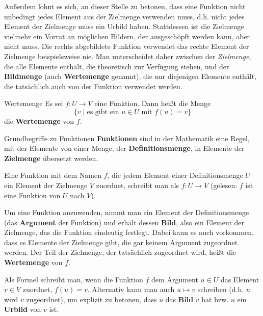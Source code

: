 \documentclass[../../main.tex]{subfiles}
\begin{document}
Außerdem lohnt es sich, an dieser Stelle zu betonen, dass eine Funktion nicht unbedingt jedes Element aus der Zielmenge verwenden muss, d.h. nicht jedes Element der Zielmenge muss ein Urbild haben. Stattdessen ist die Zielmenge vielmehr ein Vorrat an möglichen Bildern, der ausgeschöpft werden kann, aber nicht muss. Die rechts abgebildete Funktion verwendet das rechte Element der Zielmenge beispielsweise nie. Man unterscheidet daher zwischen der \emph{Zielmenge}, die alle Elemente enthält, die theoretisch zur Verfügung stehen, und der \textbf{Bildmenge} (auch \textbf{Wertemenge} genannt), die nur diejenigen Elemente enthält, die tatsächlich auch von der Funktion verwendet werden.

\begin{definition}{Wertemenge}
    Es sei $f\colon U\rightarrow V$ eine Funktion. Dann heißt die Menge
    \[\{v\mid \text{es~gibt~ein~}u\in U\text{~mit~}f(u)=v\}\]
    die \textbf{Wertemenge} von $f$.
\end{definition}

\begin{nutshell}{Grundbegriffe zu Funktionen}
    \parpic[r]{
    }
    \textbf{Funktionen} sind in der Mathematik eine Regel, mit der Elemente von einer Menge, der \textbf{Definitionsmenge}, in Elemente der \textbf{Zielmenge} übersetzt werden.
    
    Eine Funktion mit dem Namen $f$, die jedem Element einer Definitionsmenge $U$ ein Element der Zielmenge $V$ zuordnet, schreibt man als $f\colon U\rightarrow V$ (gelesen: $f$ ist eine Funktion von $U$ nach $V$).
    
    Um eine Funktion anzuwenden, nimmt man ein Element der Definitionsmenge (das \textbf{Argument} der Funktion) und erhält dessen \textbf{Bild}, also ein Element der Zielmenge, das die Funktion eindeutig festlegt. Dabei kann es auch vorkommen, dass es Elemente der Zielmenge gibt, die gar keinem Argument zugeordnet werden. Der Teil der Zielmenge, der tatsächlich zugeordnet wird, heißt die \textbf{Wertemenge} von $f$.
    
    Als Formel schreibt man, wenn die Funktion $f$ dem Argument $u\in U$ das Element $v\in V$ zuordnet, $f(u)=v$. Alternativ kann man auch $u\mapsto v$ schreiben (d.h. $u$ wird $v$ zugeordnet), um explizit zu betonen, dass $u$ das \textbf{Bild} $v$ hat bzw. $u$ ein \textbf{Urbild} von $v$ ist.
\end{nutshell}
\end{document}

